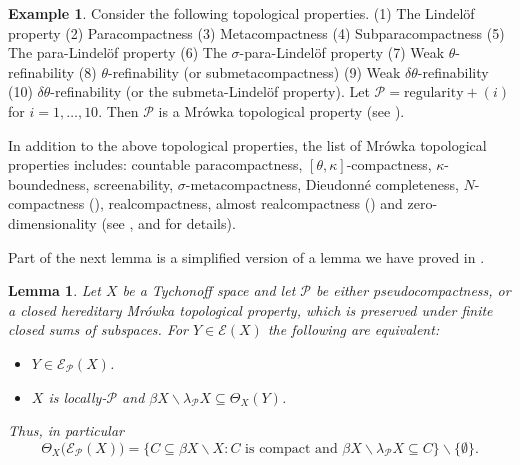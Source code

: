 \documentclass{amsart}
\newtheorem{lemma}[theorem]{Lemma}
\theoremstyle{definition}
\newtheorem{example}[theorem]{Example}
\theoremstyle{remark}
\theoremstyle{notation}
\numberwithin{equation}{section}
\begin{document}
\begin{example}\label{JHL}
Consider the following topological properties. (1) The  Lindel\"{o}f property (2) Paracompactness (3) Metacompactness (4) Subparacompactness
(5) The para-Lindel\"{o}f property (6) The  $\sigma$-para-Lindel\"{o}f  property  (7)  Weak $\theta$-refinability (8)  $\theta$-refinability (or  submetacompactness) (9) Weak $\delta\theta$-refinability (10)  $\delta\theta$-refinability (or the submeta-Lindel\"{o}f property).  Let  ${\mathcal P}=\mbox{regularity}+(i)$ for $i=1,\ldots,10$. Then $\mathcal{P}$ is a Mr\'{o}wka topological property (see \cite{Ko3}).
\end{example}

In addition to the above topological properties, the list of Mr\'{o}wka topological properties includes: countable paracompactness, $[\theta,\kappa]$-compactness,  $\kappa$-boundedness,  screenability,  $\sigma$-metacompactness,  Dieudonn\'{e} completeness, $N$-compactness (\cite{M1}),  realcompactness, almost realcompactness (\cite{F}) and zero-dimensionality (see \cite{Ko3}, \cite{MRW1} and \cite{MRW2} for details).

Part of the next lemma is a simplified version of a lemma we have proved in \cite{Ko3}.

\begin{lemma}\label{JHKFH}
Let $X$ be a Tychonoff  space and let ${\mathcal P}$ be either pseudocompactness, or a closed hereditary Mr\'{o}wka topological property, which is preserved under finite closed sums of subspaces. For $Y\in{\mathscr E}(X)$ the following are equivalent:
\begin{itemize}
\item[\rm(1)] $Y\in{\mathscr E}_{{\mathcal P}}(X)$.
\item[\rm(2)] $X$ is locally-${\mathcal P}$ and $\beta X\backslash\lambda_{{\mathcal P}} X\subseteq\Theta_X(Y)$.
\end{itemize}
Thus, in particular
\[\Theta_X\big({\mathscr E}_{{\mathcal P}}(X)\big)=\{C\subseteq\beta X\backslash X:C \mbox{ is   compact and }\beta X\backslash\lambda_{{\mathcal P}} X\subseteq C\}\backslash\{\emptyset\}.\]
\end{lemma}
\end{document}
